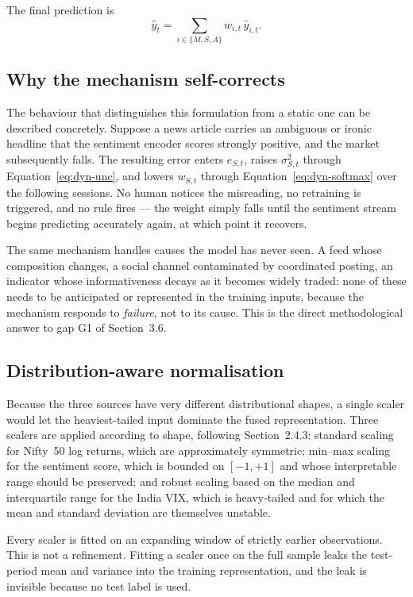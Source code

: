 The final prediction is
\begin{equation}
\hat{y}_t = \sum_{i \in \{M,S,A\}} w_{i,t}\, \hat{y}_{i,t}.
\label{eq:dyn-fused}
\end{equation}

\subsection{Why the mechanism self-corrects}

The behaviour that distinguishes this formulation from a static one can be described concretely.
Suppose a news article carries an ambiguous or ironic headline that the sentiment encoder scores
strongly positive, and the market subsequently falls. The resulting error enters $e_{S,t}$, raises
$\sigma_{S,t}^2$ through Equation~\eqref{eq:dyn-unc}, and lowers $w_{S,t}$ through
Equation~\eqref{eq:dyn-softmax} over the following sessions. No human notices the misreading, no
retraining is triggered, and no rule fires --- the weight simply falls until the sentiment stream
begins predicting accurately again, at which point it recovers.

The same mechanism handles causes the model has never seen. A feed whose composition changes, a
social channel contaminated by coordinated posting, an indicator whose informativeness decays as
it becomes widely traded: none of these needs to be anticipated or represented in the training
inputs, because the mechanism responds to \emph{failure}, not to its cause. This is the direct
methodological answer to gap G1 of Section~3.6.

\subsection{Distribution-aware normalisation}

Because the three sources have very different distributional shapes, a single scaler would let
the heaviest-tailed input dominate the fused representation. Three scalers are applied according
to shape, following Section~2.4.3: standard scaling for Nifty~50 log returns, which are
approximately symmetric; min--max scaling for the sentiment score, which is bounded on
$[-1,+1]$ and whose interpretable range should be preserved; and robust scaling based on the
median and interquartile range for the India VIX, which is heavy-tailed and for which the mean
and standard deviation are themselves unstable.

Every scaler is fitted on an expanding window of strictly earlier observations. This is not a
refinement. Fitting a scaler once on the full sample leaks the test-period mean and variance into
the training representation, and the leak is invisible because no test label is used.

